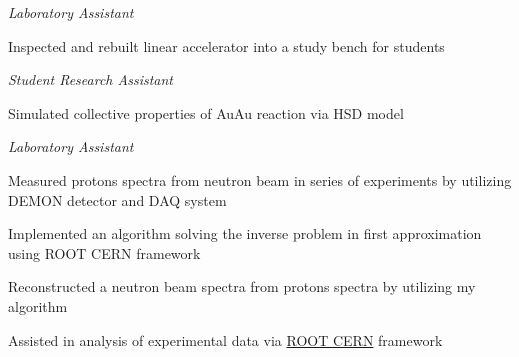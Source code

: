 \documentclass[
  a4paper, 
   maincolor=cvblue,
   sectioncolor=cvblue,
]{fortysecondscv}
\begin{document}
\begin{cvtable}
	{\textit{Laboratory Assistant}
	\normalsize
	\begin{itemize-noindent}
		\item Inspected and rebuilt linear accelerator into a study bench for students
	\end{itemize-noindent}
	}
	
	{\textit{Student Research Assistant}
	\normalsize
	\begin{itemize-noindent}
		\item Simulated collective properties of AuAu reaction via HSD model
	\end{itemize-noindent}
	}	
	
	{\textit{Laboratory Assistant}
	\normalsize
	\begin{itemize-noindent}
		\item Measured protons spectra from neutron beam in series of experiments by utilizing DEMON detector and DAQ system
		\item Implemented an algorithm solving the inverse problem in first approximation using ROOT CERN framework
		\item Reconstructed a neutron beam spectra from protons spectra by utilizing my algorithm
		\item Assisted in analysis of experimental data via \href{https://root.cern/}{ROOT CERN} framework
	\end{itemize-noindent}
	}
	
\end{cvtable}
\end{document}
